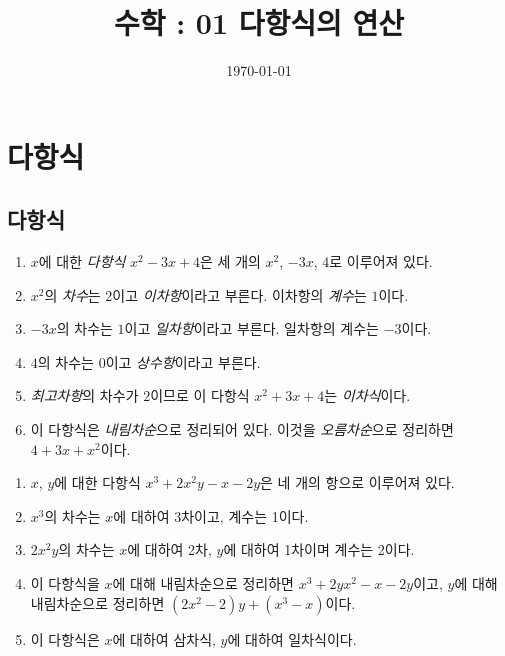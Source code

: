 \documentclass{oblivoir}
\begin{document}
\title{수학 : 01 다항식의 연산}
\author{}
\date{\today}
\maketitle
\tableofcontents
\newpage

\section{다항식}

\subsection{다항식}

%
\begin{enumerate}
\item
\(x\)에 대한 \emph{다항식} \(x^2-3x+4\)은 세 개의  \(x^2\), \(-3x\), \(4\)로 이루어져 있다.
\item
\(x^2\)의 \emph{차수}는 \(2\)이고 \emph{이차항}이라고 부른다.
이차항의 \emph{계수}는 \(1\)이다.
\item
\(-3x\)의 차수는 \(1\)이고 \emph{일차항}이라고 부른다.
일차항의 계수는 \(-3\)이다.
\item
\(4\)의 차수는 \(0\)이고 \emph{상수항}이라고 부른다.
\item
\emph{최고차항}의 차수가 \(2\)이므로 이 다항식 \(x^2+3x+4\)는 \emph{이차식}이다.
\item
이 다항식은 \emph{내림차순}으로 정리되어 있다.
이것을 \emph{오름차순}으로 정리하면 \(4+3x+x^2\)이다.
\end{enumerate}

%
\begin{enumerate}
\item
\(x\), \(y\)에 대한 다항식 \(x^3+2x^2y-x-2y\)은 네 개의 항으로 이루어져 있다.
\item
\(x^3\)의 차수는 \(x\)에 대하여 3차이고, 계수는 1이다.
\item
\(2x^2y\)의 차수는 \(x\)에 대하여 2차, \(y\)에 대하여 1차이며 계수는 2이다.
\item
이 다항식을 \(x\)에 대해 내림차순으로 정리하면 \(x^3+2yx^2-x-2y\)이고, \(y\)에 대해 내림차순으로 정리하면 \((2x^2-2)y+(x^3-x)\)이다.
\item
이 다항식은 \(x\)에 대하여 삼차식, \(y\)에 대하여 일차식이다.
\end{enumerate}

\newpage
%
\label{poly1}
\vspace{-20pt}
\tabd
{}
{}
{}
{}
{}
\end{document}
